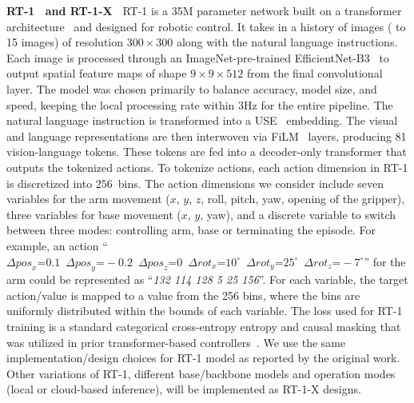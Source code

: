 \noindent\textbf{ RT-1~\cite{rt-1} and RT-1-X~\cite{9}} RT-1 is a 35M parameter network built on a transformer architecture~\cite{vaswani2017attention} and designed for robotic control. %
It takes in a history of images ( to 15 images) of resolution $300\times300$ along with the natural language instructions. 
Each image is processed through an ImageNet-pre-trained EfficientNet-B3~\cite{tan2019efficientnet} to output spatial feature maps of shape $9\times9\times512$ from the final convolutional layer.
The model was chosen primarily to balance accuracy, model size, and speed, keeping the local processing rate within 3Hz for the entire pipeline.
The natural language instruction is transformed into a USE~\cite{cer2018universal} embedding. 
The visual and language representations are then interwoven via FiLM~\cite{perez2017film} layers, producing 81 vision-language tokens. 
These tokens are fed into a decoder-only transformer that outputs the tokenized actions.
To tokenize actions, each action dimension in RT-1 is discretized into $256$~bins. 
The action dimensions we consider include seven variables for the arm movement ($x$, $y$, $z$, roll, pitch, yaw, opening of the gripper), three variables for base movement ($x$, $y$, yaw), and a discrete variable to switch between three modes: controlling arm, base or terminating the episode.
For example, an action
``$\Delta \textit{pos}_x\text{=}0.1 \enspace \Delta \textit{pos}_y\text{=}-0.2 \enspace \Delta \textit{pos}_z\text{=}0 \enspace \Delta \textit{rot}_x\text{=}10^{\circ} \enspace \Delta \textit{rot}_y\text{=}25^{\circ} \enspace \Delta \textit{rot}_z\text{=}-7^{\circ}
$'' for the arm could be represented as ``\textit{132 114 128 5 25 156}''.
For each variable, the target action/value is mapped to a value from the 256 bins, where the bins are uniformly distributed within the bounds of each variable. The {loss}
used for RT-1 training is a standard categorical cross-entropy entropy and causal masking that was utilized in prior transformer-based controllers~\cite{reed2022generalist,lee2022multi}. 
We use the same implementation/design choices for RT-1 model as reported by the original work. Other variations of RT-1, \eg different base/backbone models and operation modes (\ie local or cloud-based inference), will be implemented as RT-1-X designs.


